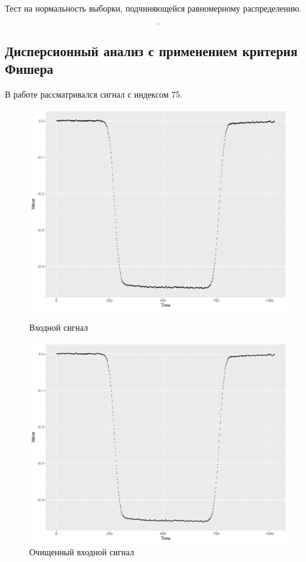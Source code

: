 \documentclass[a4paper]{article}
\begin{document}
\begin{enumerate}
\begin{table}[H]
    \caption{Тест на нормальность выборки, подчиняющейся равномерному распределению.}
    \label{tab:chi2unif}
\end{table}
\begin{equation*}
    .
\end{equation*}
\end{enumerate}
\subsection{Дисперсионный анализ с применением критерия Фишера}
В работе рассматривался сигнал с индексом 75.
\begin{figure}[H]
    \centering
    \begin{minipage}{0.5\textwidth}
        \centering
        \includegraphics[width=\textwidth]{LabSrcs/resources/wave_pic.pdf}
        \caption{Входной сигнал}
    \end{minipage}\hfill
    \begin{minipage}{0.5\textwidth}
        \centering
        \includegraphics[width=\textwidth]{LabSrcs/resources/wave_smoothed_pic.pdf}
        \caption{Очищенный входной сигнал}
    \end{minipage}
\end{figure}
\end{document}
